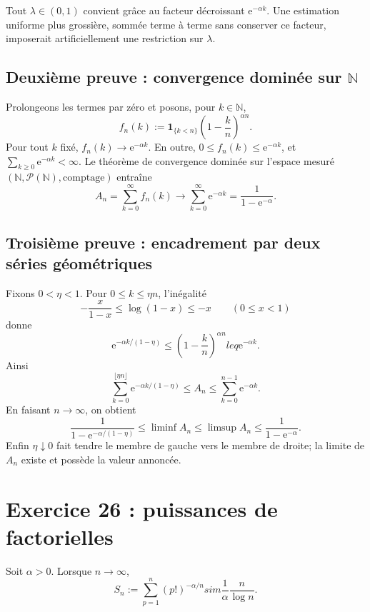 \documentclass[11pt,a4paper]{article}
\newcommand{\e}{\mathrm e}
\newcommand{\N}{\mathbb N}
\begin{document}
\begin{remarkbox}
Tout $\lambda\in(0,1)$ convient grâce au facteur décroissant
$\e^{-\alpha k}$. Une estimation uniforme plus grossière, sommée terme à
terme sans conserver ce facteur, imposerait artificiellement une restriction
sur $\lambda$.
\end{remarkbox}

\subsection{Deuxième preuve : convergence dominée sur $\N$}

\begin{proofbox}
Prolongeons les termes par zéro et posons, pour $k\in\N$,
\[
f_n(k):=\mathbf 1_{\{k<n\}}\left(1-\frac{k}{n}\right)^{\alpha n}.
\]
Pour tout $k$ fixé, $f_n(k)\to\e^{-\alpha k}$. En outre,
$0\leq f_n(k)\leq\e^{-\alpha k}$, et
$\sum_{k\geq0}\e^{-\alpha k}<\infty$. Le théorème de convergence dominée
sur l'espace mesuré $(\N,\mathcal P(\N),\text{comptage})$ entraîne
\[
A_n=\sum_{k=0}^{\infty}f_n(k)\longrightarrow
\sum_{k=0}^{\infty}\e^{-\alpha k}=\frac{1}{1-\e^{-\alpha}}.
\]
\end{proofbox}

\subsection{Troisième preuve : encadrement par deux séries géométriques}

\begin{proofbox}
Fixons $0<\eta<1$. Pour $0\leq k\leq\eta n$, l'inégalité
\[
-\frac{x}{1-x}\leq\log(1-x)\leq-x\qquad(0\leq x<1)
\]
donne
\[
\e^{-\alpha k/(1-\eta)}
\leq\left(1-\frac{k}{n}\right)^{\alpha n}leq\e^{-\alpha k}.
\]
Ainsi
\[
\sum_{k=0}^{\lfloor\eta n\rfloor}\e^{-\alpha k/(1-\eta)}
\leq A_n\leq\sum_{k=0}^{n-1}\e^{-\alpha k}.
\]
En faisant $n\to\infty$, on obtient
\[
\frac1{1-\e^{-\alpha/(1-\eta)}}
\leq\liminf A_n\leq\limsup A_n\leq\frac1{1-\e^{-\alpha}}.
\]
Enfin $\eta\downarrow0$ fait tendre le membre de gauche vers le membre de
droite; la limite de $A_n$ existe et possède la valeur annoncée.
\end{proofbox}

\section{Exercice 26 : puissances de factorielles}

\begin{theorembox}
Soit $\alpha>0$. Lorsque $n\to\infty$,
\[
 S_n:=\sum_{p=1}^{n}(p!)^{-\alpha/n}sim
 \frac1\alpha\frac{n}{\log n}.
\]
\end{theorembox}
\end{document}

